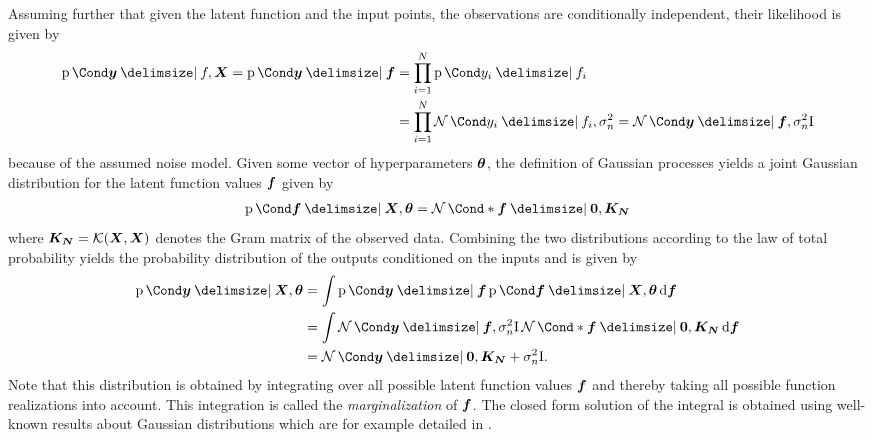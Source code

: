 Assuming further that given the latent function and the input points, the observations are conditionally independent, their likelihood is given by
\begin{align}
    \Prob{\mat{y} \given f, \mat{X}} = \Prob{\mat{y} \given \mat{f}} &= \prod_{i = 1}^N \Prob{y_i \given f_i} \\
    &= \prod_{i = 1}^N \Gaussian{y_i \given f_i, \sigma_n^2} = \Gaussian{\mat{y} \given \mat{f}, \sigma_n^2 \Eye}
\end{align}
because of the assumed noise model.
Given some vector of hyperparameters $\bm{\theta}$, the definition of Gaussian processes yields a joint Gaussian distribution for the latent function values $\bm{f}$ given by
\begin{align}
    \Prob{\mat{f} \given \mat{X}, \mat{\theta}} = \Gaussian*{\mat{f} \given \mat{0}, \mat{K_N}}
\end{align}
where $\bm{K_N} = \operatorname{\mathcal{K}}(\bm{X}, \bm{X})$ denotes the Gram matrix of the observed data.
Combining the two distributions according to the law of total probability yields the probability distribution of the outputs conditioned on the inputs and is given by
\begin{align}
    \begin{split}
        \label{eq:gp_marginal_likelihood}
        \Prob{\mat{y} \given \mat{X}, \mat{\theta}} &= \int \Prob{\mat{y} \given \mat{f}} \Prob{\mat{f} \given \mat{X}, \mat{\theta}} \diff \mat{f} \\
        &= \int \Gaussian{\mat{y} \given \mat{f}, \sigma_n^2 \Eye} \Gaussian*{\mat{f} \given \mat{0}, \mat{K_N}} \diff \mat{f} \\
        &= \Gaussian{\mat{y} \given \mat{0}, \mat{K_N} + \sigma_n^2 \Eye}.
    \end{split}
\end{align}
Note that this distribution is obtained by integrating over all possible latent function values $\bm{f}$ and thereby taking all possible function realizations into account.
This integration is called the \emph{marginalization} of $\bm{f}$.
The closed form solution of the integral is obtained using well-known results about Gaussian distributions which are for example detailed in \cite{petersen_matrix_2008}.


